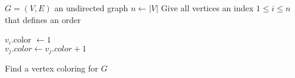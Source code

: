 \documentclass{article}
\begin{document}
\begin{preview}
    \begin{algorithm}[H]
        \begin{algorithmic}
            \Require $G = (V, E)$ an undirected graph
            \State $n \gets |V|$
            \State Give all vertices an index $1 \leq i \leq n$ that defines an order
            
                \State $v_i$.color $\gets 1$
            \EndFor
            \\
                        \State $v_j.color \gets v_j.color + 1$
                    \EndIf
                \EndFor
            \EndFor
        \end{algorithmic}
    \caption{Find a vertex coloring for $G$}
    \label{alg:vertexColoring}
    \end{algorithm}
\end{preview}
\end{document}

